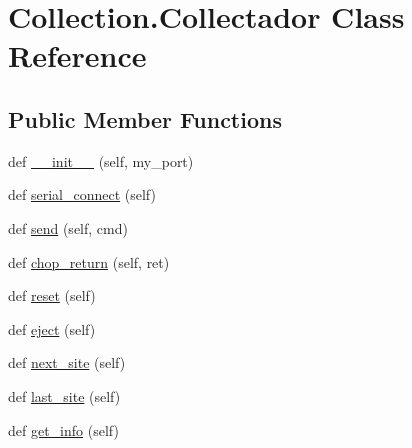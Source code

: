 \hypertarget{class_collection_1_1_collectador}{}\section{Collection.\+Collectador Class Reference}
\label{class_collection_1_1_collectador}
\subsection*{Public Member Functions}
\begin{DoxyCompactItemize}
\item 
def \mbox{\hyperlink{class_collection_1_1_collectador_af9b0ad6313049442cdc6e924a017693e}{\+\_\+\+\_\+init\+\_\+\+\_\+}} (self, my\+\_\+port)
\item 
def \mbox{\hyperlink{class_collection_1_1_collectador_a3d72795fd989947bee15cdd66f277815}{serial\+\_\+connect}} (self)
\item 
def \mbox{\hyperlink{class_collection_1_1_collectador_a06c63ef23395dbbc8975e407500ed593}{send}} (self, cmd)
\item 
def \mbox{\hyperlink{class_collection_1_1_collectador_a1fcc60319735e3e18d938c84073aef20}{chop\+\_\+return}} (self, ret)
\item 
def \mbox{\hyperlink{class_collection_1_1_collectador_ada8c768e4da16031fe01afcef78957e1}{reset}} (self)
\item 
def \mbox{\hyperlink{class_collection_1_1_collectador_a4e3a010e6084283e311c019de7f7cc5b}{eject}} (self)
\item 
def \mbox{\hyperlink{class_collection_1_1_collectador_aa156ce605af4adfec1bfb7aa8447eb65}{next\+\_\+site}} (self)
\item 
def \mbox{\hyperlink{class_collection_1_1_collectador_a784d44c359c9a4109ccd62b52a9a1e05}{last\+\_\+site}} (self)
\item 
def \mbox{\hyperlink{class_collection_1_1_collectador_a23757363741c6dd611d91dd984013d86}{get\+\_\+info}} (self)
\end{DoxyCompactItemize}
